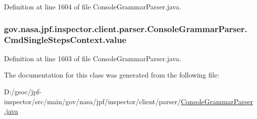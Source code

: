 Definition at line 1604 of file Console\+Grammar\+Parser.\+java.

\subsubsection[{\texorpdfstring{value}{value}}]{ gov.\+nasa.\+jpf.\+inspector.\+client.\+parser.\+Console\+Grammar\+Parser.\+Cmd\+Single\+Steps\+Context.\+value}\hypertarget{classgov_1_1nasa_1_1jpf_1_1inspector_1_1client_1_1parser_1_1_console_grammar_parser_1_1_cmd_single_steps_context_a7585552ff228d1d3fa66164ae1879910}{}\label{classgov_1_1nasa_1_1jpf_1_1inspector_1_1client_1_1parser_1_1_console_grammar_parser_1_1_cmd_single_steps_context_a7585552ff228d1d3fa66164ae1879910}


Definition at line 1603 of file Console\+Grammar\+Parser.\+java.



The documentation for this class was generated from the following file\+:\begin{DoxyCompactItemize}
\item 
D\+:/gsoc/jpf-\/inspector/src/main/gov/nasa/jpf/inspector/client/parser/\hyperlink{_console_grammar_parser_8java}{Console\+Grammar\+Parser.\+java}\end{DoxyCompactItemize}
